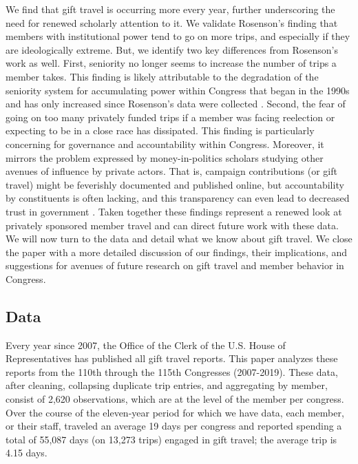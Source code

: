 \documentclass[12pt]{article}                           %
\begin{document}
We find that gift travel is occurring more every year, further underscoring the need for renewed scholarly attention to it. We validate Rosenson's finding that members with institutional power tend to go on more trips, and especially if they are ideologically extreme. But, we identify two key differences from Rosenson's work as well. First, seniority no longer seems to increase the number of trips a member takes. This finding is likely attributable to the degradation of the seniority system for accumulating power within Congress that began in the 1990s and has only increased since Rosenson's data were collected \citep{Sinclair2012,Theriault2008}. Second, the fear of going on too many privately funded trips if a member was facing reelection or expecting to be in a close race has dissipated. This finding is particularly concerning for governance and accountability within Congress. Moreover, it mirrors the problem expressed by money-in-politics scholars studying other avenues of influence by private actors. That is, campaign contributions (or gift travel) might be feverishly documented and published online, but accountability by constituents is often lacking, and this transparency can even lead to decreased trust in government \citep{Primo2006}. Taken together these findings represent a renewed look at privately sponsored member travel and can direct future work with these data. We will now turn to the data and detail what we know about gift travel. We close the paper with a more detailed discussion of our findings, their implications, and suggestions for avenues of future research on gift travel and member behavior in Congress.

\subsection*{\centering Data}

Every year since 2007, the Office of the Clerk of the U.S. House of Representatives has published all gift travel reports. This paper analyzes these reports from the 110th through the 115th Congresses (2007-2019). These data, after cleaning, collapsing duplicate trip entries, and aggregating by member, consist of 2,620 observations, which are at the level of the member per congress. Over the course of the eleven-year period for which we have data, each member, or their staff, traveled an average 19 days per congress and reported spending a total of 55,087 days (on 13,273 trips) engaged in gift travel; the average trip is 4.15 days.
\end{document}
